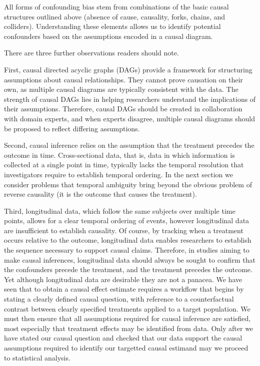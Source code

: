 \documentclass[
  singlecolumn]{article}
\begin{document}
All forms of confounding bias stem from combinations of the basic causal
structures outlined above (absence of cause, causality, forks, chains,
and colliders). Understanding these elements allows us to identify
potential confounders based on the assumptions encoded in a causal
diagram.

There are three further observations readers should note.

First, causal directed acyclic graphs (DAGs) provide a framework for
structuring assumptions about causal relationships. They cannot prove
causation on their own, as multiple causal diagrams are typically
consistent with the data. The strength of causal DAGs lies in helping
researchers understand the implications of their assumptions. Therefore,
causal DAGs should be created in collaboration with domain experts, and
when experts disagree, multiple causal diagrams should be proposed to
reflect differing assumptions.

Second, causal inference relies on the assumption that the treatment
precedes the outcome in time. Cross-sectional data, that is, data in
which information is collected at a single point in time, typically
lacks the temporal resolution that investigators require to establish
temporal ordering. In the next section we consider problems that
temporal ambiguity bring beyond the obvious problem of reverse causality
(it is the outcome that causes the treatment).

Third, longitudinal data, which follow the same subjects over multiple
time points, allows for a clear temporal ordering of events, however
longitudinal data are insufficient to establish causality. Of course, by
tracking when a treatment occurs relative to the outcome, longitudinal
data enables researchers to establish the sequence necessary to support
causal claims. Therefore, in studies aiming to make causal inferences,
longitudinal data should always be sought to confirm that the
confounders precede the treatment, and the treatment precedes the
outcome. Yet although longitudinal data are desirable they are not a
panacea. We have seen that to obtain a causal effect estimate requires a
workflow that begins by stating a clearly defined causal question, with
reference to a counterfactual contrast between clearly specified
treatments applied to a target population. We must then ensure that all
assumptions required for causal inference are satisfied, most especially
that treatment effects may be identified from data. Only after we have
stated our causal question and checked that our data support the causal
assumptions required to identify our targetted causal estimand may we
proceed to statistical analysis.
\end{document}
